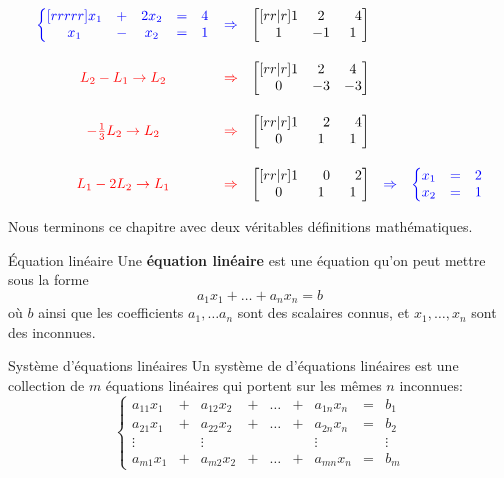 \begin{Example}
\[
\begin{matrix}
\color{blue}\left\{
\begin{matrix}[rrrrr]
x_1 &+& 2x_2 &=& 4\\
x_1 & -& x_2 &=& 1
\end{matrix} \right. &\color{blue}\Rightarrow&
\begin{bmatrix}[rr|r]
1 & 2 & \hphantom{-}4\\
1 & -1 & 1
\end{bmatrix} \\[20pt]
\color{red}L_2 - L_1 \rightarrow L_2 &\color{red}\Rightarrow&
\begin{bmatrix}[rr|r]
1 & 2 & 4\\
0 & -3 & -3
\end{bmatrix} \\[20pt]
\color{red}-\frac13 L_2 \rightarrow L_2 &\color{red}\Rightarrow&
\begin{bmatrix}[rr|r]
1 & \hphantom{-}2 & \hphantom{-}4\\
0 & 1 & 1
\end{bmatrix} \\[20pt]
\color{red}L_1 - 2L_2 \rightarrow L_1 &\color{red}\Rightarrow&
\begin{bmatrix}[rr|r]
1 & \hphantom{-}0 & \hphantom{-}2\\
0 & 1 & 1
\end{bmatrix} &\color{blue}\Rightarrow&
\color{blue}\left\{
\begin{matrix}
x_1 &=& 2\\
x_2 &=& 1
\end{matrix}
\right.
\end{matrix}
\]
\end{Example}

Nous terminons ce chapitre avec deux véritables définitions mathématiques.

\begin{TrueDef}{Équation linéaire}
Une \textbf{équation linéaire} est une équation qu'on peut mettre sous la forme
\[
a_1 x_1 + \ldots + a_n x_n = b
\]
où $b$ ainsi que les coefficients $a_1, \ldots a_n$ sont
des scalaires connus, et $x_1, \ldots, x_n$ sont des
inconnues.
\end{TrueDef}

\begin{TrueDef}{Système d'équations linéaires}
Un système de d'équations linéaires est une
collection de $m$ équations linéaires qui portent
sur les mêmes $n$ inconnues:
\[
\left\{
	\begin{matrix}
	a_{11}x_1 &+& a_{12}x_2 &+& \ldots &+& a_{1n}x_n &=& b_1 \\
	a_{21}x_1 &+& a_{22}x_2 &+& \ldots &+& a_{2n}x_n &=& b_2 \\
	\vdots && \vdots &&  && \vdots && \vdots \\
	a_{m1}x_1 &+& a_{m2}x_2 &+& \ldots &+& a_{mn}x_n &=& b_m
	\end{matrix}
	\right.
\]
\end{TrueDef}

